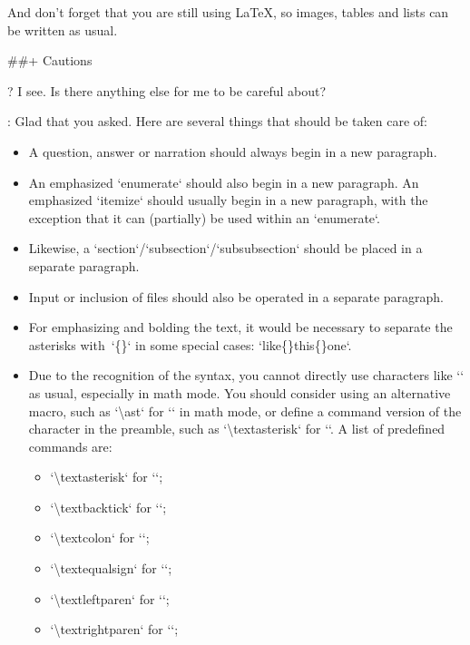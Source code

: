 \documentclass[%
  use style = classical,
  scroll,
]{Q-and-A}
\begin{document}
  \medskip

  And don't forget that you are still using \LaTeX, so images, tables and lists can be written as usual.


##+ {Cautions}

?
  I see. Is there anything else for me to be careful about?

:
  Glad that you asked. Here are several things that should be taken care of:
  \begin{itemize}
    \item A question, answer or narration should always begin in a new paragraph.
    \item An emphasized `enumerate` should also begin in a new paragraph. An emphasized `itemize` should usually begin in a new paragraph, with the exception that it can (partially) be used within an `enumerate`.
    \item Likewise, a `section`/`subsection`/`subsubsection` should be placed in a separate paragraph.
    \item Input or inclusion of files should also be operated in a separate paragraph.
    \item For emphasizing and bolding the text, it would be necessary to separate the asterisks with~`\{\}` in some special cases: `\textasterisk\textasterisk like\textasterisk\textasterisk\{\}\textasterisk\textasterisk\textasterisk this\textasterisk\textasterisk\textasterisk\{\}\textasterisk one\textasterisk`.
    \item Due to the recognition of the syntax, you cannot directly use characters like `\textasterisk` as usual, especially in math mode. You should consider using an alternative macro, such as `\textbackslash ast` for `\textasterisk` in math mode, or define a command version of the character in the preamble, such as `\textbackslash textasterisk` for `\textasterisk`. A list of predefined commands are:
    \begin{itemize}
      \item `\textbackslash textasterisk` for `\textasterisk`;
      \item `\textbackslash textbacktick` for `\textbacktick`;
      \item `\textbackslash textcolon` for `\textcolon`;
      \item `\textbackslash textequalsign` for `\textequalsign`;
      \item `\textbackslash textleftparen` for `\textleftparen`;
      \item `\textbackslash textrightparen` for `\textrightparen`;

\end{itemize}
\end{itemize}
\end{document}
